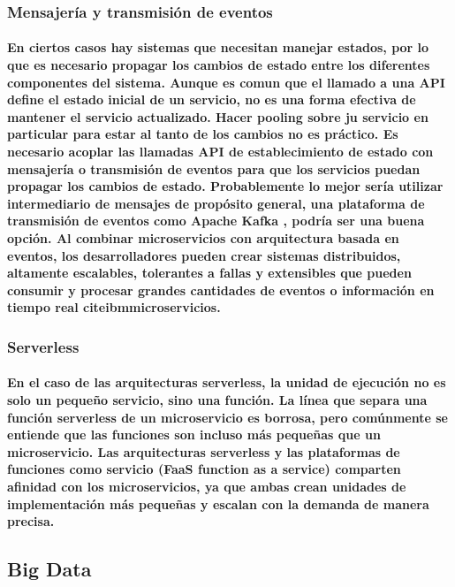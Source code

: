 \subsubsection{Mensajería y transmisión de eventos}
\paragraph{
    En ciertos casos hay sistemas que necesitan manejar estados, por lo que es necesario propagar los cambios de estado entre los diferentes componentes del sistema. Aunque es comun que el llamado a una API define el estado inicial de un servicio, no es una forma efectiva de mantener el servicio actualizado. Hacer pooling sobre ju servicio en particular para estar al tanto de los cambios no es práctico. Es necesario acoplar las llamadas API de establecimiento de estado con mensajería o transmisión de eventos para que los servicios puedan propagar los cambios de estado. Probablemente lo mejor sería utilizar intermediario de mensajes de propósito general, una plataforma de transmisión de eventos como Apache Kafka \cite{BibEntry2022Apr}, podría ser una buena opción. Al combinar microservicios con arquitectura basada en eventos, los desarrolladores pueden crear sistemas distribuidos, altamente escalables, tolerantes a fallas y extensibles que pueden consumir y procesar grandes cantidades de eventos o información en tiempo real cite{ibmmicroservicios}.
}

\subsubsection{Serverless}
\paragraph{
    En el caso de las arquitecturas serverless, la unidad de ejecución no es solo un pequeño servicio, sino una función. La línea que separa una función serverless de un microservicio es borrosa, pero comúnmente se entiende que las funciones son incluso más pequeñas que un microservicio.
    Las arquitecturas serverless y las plataformas de funciones como servicio (FaaS function as a service) comparten afinidad con los microservicios, ya que ambas crean unidades de implementación más pequeñas y escalan con la demanda de manera precisa\cite{ibmmicroservicios}.
}


\subsection{Big Data}

